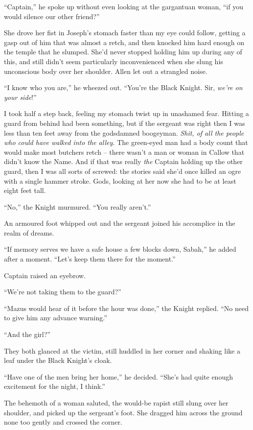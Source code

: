 \documentclass[12pt, openany]{book}
\begin{document}
“Captain,” he spoke up without even looking at the gargantuan woman, “if you would silence our other friend?”

She drove her fist in Joseph’s stomach faster than my eye could follow, getting a gasp out of him that was almost a retch, and then knocked him hard enough on the temple that he slumped. She’d never stopped holding him up during any of this, and still didn’t seem particularly inconvenienced when she slung his unconscious body over her shoulder. Allen let out a strangled noise.

“I know who you are,” he wheezed out. “You’re the Black Knight. Sir, \textit{we’re on your side}!”

I took half a step back, feeling my stomach twist up in unashamed fear. Hitting a guard from behind had been something, but if the sergeant was right then I was less than ten feet away from the godsdamned boogeyman. \textit{Shit, of all the people who could have walked into the alley. }The green-eyed man had a body count that would make most butchers retch – there wasn’t a man or woman in Callow that didn’t know the Name. And if that was really \textit{the} Captain holding up the other guard, then I was all sorts of screwed: the stories said she’d once killed an ogre with a single hammer stroke. Gods, looking at her now she had to be at least eight feet tall.

“No,” the Knight murmured. “You really aren’t.”

An armoured foot whipped out and the sergeant joined his accomplice in the realm of dreams.

“If memory serves we have a safe house a few blocks down, Sabah,” he added after a moment. “Let’s keep them there for the moment.”

Captain raised an eyebrow.

“We’re not taking them to the guard?”

“Mazus would hear of it before the hour was done,” the Knight replied. “No need to give him any advance warning.”

“And the girl?”

They both glanced at the victim, still huddled in her corner and shaking like a leaf under the Black Knight’s cloak.

“Have one of the men bring her home,” he decided. “She’s had quite enough excitement for the night, I think.”

The behemoth of a woman saluted, the would-be rapist still slung over her shoulder, and picked up the sergeant’s foot. She dragged him across the ground none too gently and crossed the corner.
\end{document}
